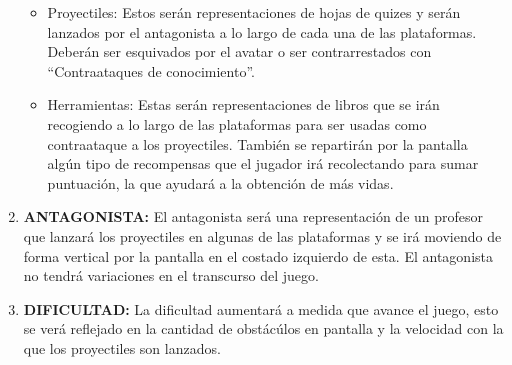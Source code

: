 \documentclass{article}
\begin{document}
\begin{enumerate}
\begin{itemize}
        \item Proyectiles: Estos serán representaciones de hojas de quizes y serán lanzados por el antagonista a lo largo de cada una de las plataformas. Deberán ser esquivados por el avatar o ser contrarrestados con “Contraataques de conocimiento”.
        \item Herramientas: Estas serán representaciones de libros que se irán recogiendo a lo largo de las plataformas para ser usadas como contraataque a los proyectiles. También se repartirán por la pantalla algún tipo de recompensas que el jugador irá recolectando para sumar puntuación, la que ayudará a la obtención de más vidas.
    \end{itemize}
  \item \textbf{ANTAGONISTA:} El antagonista será una representación de un profesor que lanzará los proyectiles en algunas de las plataformas y se irá moviendo de forma vertical por la pantalla en el costado izquierdo de esta. El antagonista no tendrá variaciones en el transcurso del juego.
  \item \textbf{DIFICULTAD:} La dificultad aumentará a medida que avance el juego, esto se verá reflejado en la cantidad de obstácúlos en pantalla y la velocidad con la que los proyectiles son lanzados.
\end{enumerate}
\end{document}
